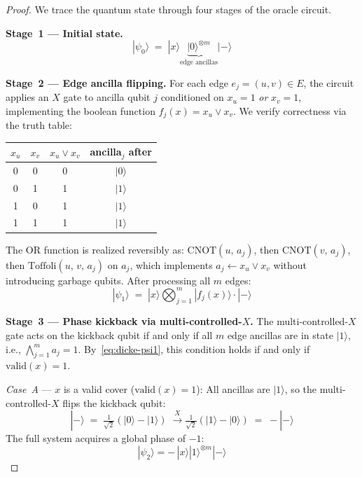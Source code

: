 \documentclass{ieeeaccess}
\newenvironment{prf}{\begin{proof}}{\end{proof}}
\begin{document}
\begin{prf}
We trace the quantum state through four stages of the oracle
circuit.

\medskip
\noindent\textbf{Stage~1 --- Initial state.}
\begin{equation}
    |\psi_0\rangle
    \;=\;
    |x\rangle
    \underbrace{|0\rangle^{\otimes m}}_{\text{edge ancillas}}
    |-\rangle
    \label{eq:dicke-psi0}
\end{equation}

\medskip
\noindent\textbf{Stage~2 --- Edge ancilla flipping.}
For each edge $e_j = (u,v) \in E$, the circuit applies an $X$
gate to ancilla qubit $j$ conditioned on $x_u = 1$
\emph{or} $x_v = 1$, implementing the boolean function
$f_j(x) = x_u \vee x_v$. We verify correctness via the
truth table:

\begin{center}
\begin{tabular}{cc|c|c}
$x_u$ & $x_v$ & $x_u \vee x_v$ & ancilla$_j$ after \\
\hline
0 & 0 & 0 & $|0\rangle$ \\
0 & 1 & 1 & $|1\rangle$ \\
1 & 0 & 1 & $|1\rangle$ \\
1 & 1 & 1 & $|1\rangle$ \\
\end{tabular}
\end{center}

\noindent
The OR function is realized reversibly as:
$\mathrm{CNOT}(u,\,a_j)$,
then $\mathrm{CNOT}(v,\,a_j)$,
then $\mathrm{Toffoli}(u,\,v,\,a_j)$ on $a_j$, which
implements $a_j \leftarrow x_u \vee x_v$ without introducing
garbage qubits. After processing all $m$ edges:
\begin{equation}
    |\psi_1\rangle
    \;=\;
    |x\rangle
    \bigotimes_{j=1}^{m} |f_j(x)\rangle
    \cdot |-\rangle
    \label{eq:dicke-psi1}
\end{equation}

\medskip
\noindent\textbf{Stage~3 --- Phase kickback via
multi-controlled-$X$.}
The multi-controlled-$X$ gate acts on the kickback qubit if
and only if all $m$ edge ancillas are in state $|1\rangle$,
i.e., $\bigwedge_{j=1}^{m} a_j = 1$. By~\eqref{eq:dicke-psi1},
this condition holds if and only if $\mathrm{valid}(x) = 1$.

\smallskip
\noindent\textit{Case~A} --- $x$ is a valid cover
($\mathrm{valid}(x) = 1$): All ancillas are $|1\rangle$,
so the multi-controlled-$X$ flips the kickback qubit:
\begin{equation}
    |-\rangle
    \;=\;
    \tfrac{1}{\sqrt{2}}(|0\rangle - |1\rangle)
    \;\xrightarrow{\;X\;}
    \tfrac{1}{\sqrt{2}}(|1\rangle - |0\rangle)
    \;=\;
    -|-\rangle
    \label{eq:kickback-flip}
\end{equation}
The full system acquires a global phase of $-1$:
\begin{equation}
    |\psi_2\rangle
    = -\,|x\rangle|1\rangle^{\otimes m}|-\rangle
    \label{eq:dicke-psi2-valid}
\end{equation}


\end{prf}
\end{document}
